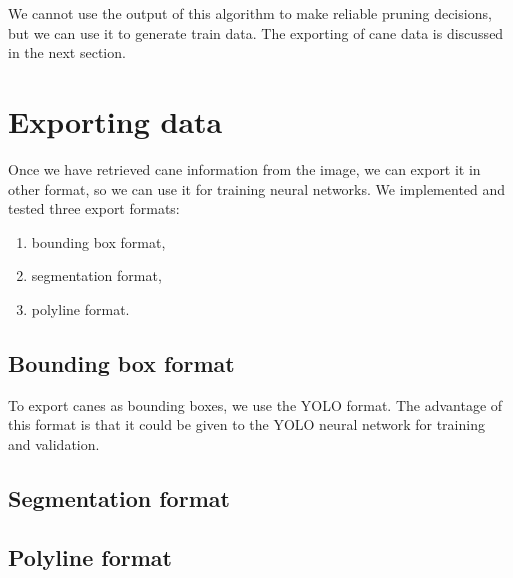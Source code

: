 \documentclass{PSAIE}%
\begin{document}
We cannot use the output of this algorithm to make reliable pruning decisions, but we can use it to generate
train data. The exporting of cane data is discussed in the next section.

\section{Exporting data} \label{sec_exporting_data}
Once we have retrieved cane information from the image, we can export it in other format, so we can use it for
training neural networks. We implemented and tested three export formats:

\begin{enumerate}
      \item bounding box format,
      \item segmentation format,
      \item polyline format.
\end{enumerate}

\subsection{Bounding box format} \label{sec_export_bounding_box_format}
To export canes as bounding boxes, we use the YOLO format. The advantage of this format is that it could be
given to the YOLO neural network for training and validation.

\subsection{Segmentation format} \label{sec_export_segmentation_format}

\subsection{Polyline format} \label{sec_export_polyline_format}



\end{document}
